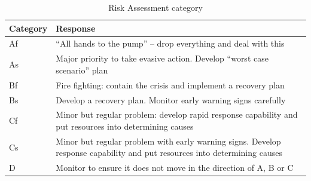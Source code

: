 \documentclass[openany,12pt]{report}
\begin{document}
\newpage
\begin{table} [htb]
\centering
\begin{tabular}{|p{3cm}|p{10cm}|}\hline
\textbf{Category}	&\textbf{Response}\\\hline\hline
Af &“All hands to the pump” – drop everything and deal with this\\\hline
As &Major priority to take evasive action. Develop “worst case scenario” plan\\\hline
Bf &Fire fighting: contain the crisis and implement a recovery plan\\\hline
Bs &Develop a recovery plan. Monitor early warning signs carefully\\\hline
Cf &Minor but regular problem: develop rapid response capability and put resources into determining causes \\\hline
Cs &Minor but regular problem with early warning signs. Develop response capability and put resources into determining causes\\\hline
D &Monitor to ensure it does not move in the direction of A, B or C \\\hline

\end{tabular}
\caption{Risk Assessment category}
\label{tab:nnwork}
\end{table}
\end{document}
